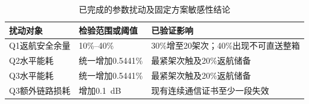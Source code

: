 \begin{table}[H]\centering\small
\caption{已完成的参数扰动及固定方案敏感性结论}\label{tab:sensitivity_summary}
\begin{tabular}{lll}\toprule
扰动对象 & 检验范围或阈值 & 已验证影响\\\midrule
Q1返航安全余量 & 10\%--40\% & 30\%增至20架次；40\%出现不可直送整箱\\
Q2水平能耗 & 统一增加0.5441\% & 最紧架次触及20\%返航储备\\
Q3水平能耗 & 统一增加0.5441\% & 最紧架次触及20\%返航储备\\
Q3额外链路损耗 & 增加0.1~dB & 现有连续通信证书至少一段失效\\\bottomrule
\end{tabular}\end{table}
